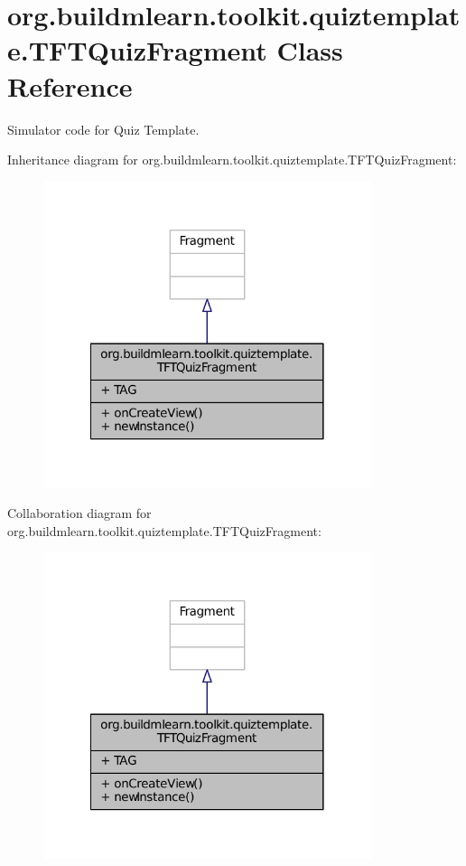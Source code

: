 \hypertarget{classorg_1_1buildmlearn_1_1toolkit_1_1quiztemplate_1_1TFTQuizFragment}{\section{org.\-buildmlearn.\-toolkit.\-quiztemplate.\-T\-F\-T\-Quiz\-Fragment Class Reference}
\label{classorg_1_1buildmlearn_1_1toolkit_1_1quiztemplate_1_1TFTQuizFragment}
}


Simulator code for Quiz Template.  




Inheritance diagram for org.\-buildmlearn.\-toolkit.\-quiztemplate.\-T\-F\-T\-Quiz\-Fragment\-:
\nopagebreak
\begin{figure}[H]
\begin{center}
\leavevmode
\includegraphics[width=272pt]{d2/d3a/classorg_1_1buildmlearn_1_1toolkit_1_1quiztemplate_1_1TFTQuizFragment__inherit__graph}
\end{center}
\end{figure}


Collaboration diagram for org.\-buildmlearn.\-toolkit.\-quiztemplate.\-T\-F\-T\-Quiz\-Fragment\-:
\nopagebreak
\begin{figure}[H]
\begin{center}
\leavevmode
\includegraphics[width=272pt]{dc/d1a/classorg_1_1buildmlearn_1_1toolkit_1_1quiztemplate_1_1TFTQuizFragment__coll__graph}
\end{center}
\end{figure}
